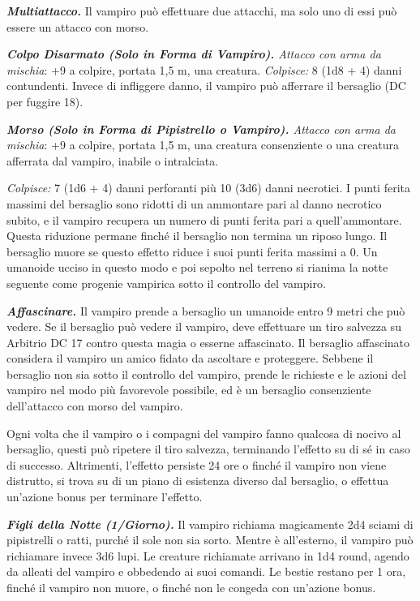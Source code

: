 \begin{multicols}{2}
\emph{\textbf{Multiattacco.}} Il vampiro può effettuare due attacchi, ma
solo uno di essi può essere un attacco con morso.

\emph{\textbf{Colpo Disarmato (Solo in Forma di Vampiro).} Attacco con
arma da mischia}: +9 a colpire, portata 1,5 m, una creatura.
\emph{Colpisce:} 8 (1d8 + 4) danni contundenti. Invece di infliggere
danno, il vampiro può afferrare il bersaglio (DC per fuggire 18).

\emph{\textbf{Morso (Solo in Forma di Pipistrello o Vampiro).} Attacco
con arma da mischia}: +9 a colpire, portata 1,5 m, una creatura
consenziente o una creatura afferrata dal vampiro, inabile o
intralciata.

\emph{Colpisce:} 7 (1d6 + 4) danni perforanti più 10 (3d6) danni
necrotici. I punti ferita massimi del bersaglio sono ridotti di un
ammontare pari al danno necrotico subito, e il vampiro recupera un
numero di punti ferita pari a quell'ammontare. Questa riduzione permane
finché il bersaglio non termina un riposo lungo. Il bersaglio muore se
questo effetto riduce i suoi punti ferita massimi a 0. Un umanoide
ucciso in questo modo e poi sepolto nel terreno si rianima la notte
seguente come progenie vampirica sotto il controllo del vampiro.

\emph{\textbf{Affascinare.}} Il vampiro prende a bersaglio un umanoide
entro 9 metri che può vedere. Se il bersaglio può vedere il vampiro,
deve effettuare un tiro salvezza su Arbitrio DC 17 contro questa magia o
esserne affascinato. Il bersaglio affascinato considera il vampiro un
amico fidato da ascoltare e proteggere. Sebbene il bersaglio non sia
sotto il controllo del vampiro, prende le richieste e le azioni del
vampiro nel modo più favorevole possibile, ed è un bersaglio
consenziente dell'attacco con morso del vampiro.

Ogni volta che il vampiro o i compagni del vampiro fanno qualcosa di
nocivo al bersaglio, questi può ripetere il tiro salvezza, terminando
l'effetto su di sé in caso di successo. Altrimenti, l'effetto persiste
24 ore o finché il vampiro non viene distrutto, si trova su di un piano
di esistenza diverso dal bersaglio, o effettua un'azione bonus per
terminare l'effetto.

\emph{\textbf{Figli della Notte (1/Giorno).}} Il vampiro richiama
magicamente 2d4 sciami di pipistrelli o ratti, purché il sole non sia
sorto. Mentre è all'esterno, il vampiro può richiamare invece 3d6 lupi.
Le creature richiamate arrivano in 1d4 round, agendo da alleati del
vampiro e obbedendo ai suoi comandi. Le bestie restano per 1 ora, finché
il vampiro non muore, o finché non le congeda con un'azione bonus.


\end{multicols}
